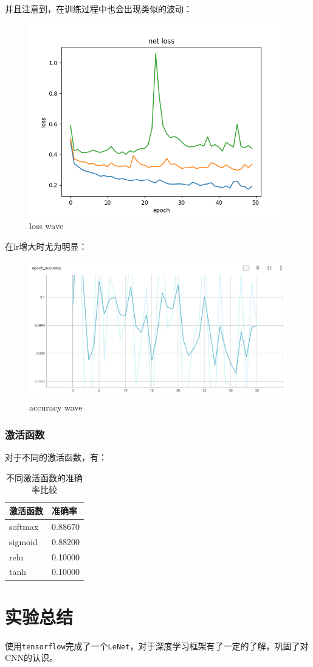 \documentclass[12pt,a4paper]{article}
\begin{document}
并且注意到，在训练过程中也会出现类似的波动：

\begin{figure}[htbp]
    \centering
    \includegraphics[width=0.5\linewidth]{img/loss_wave.png}
    \caption{loss wave}
\end{figure} 

在lr增大时尤为明显：

\begin{figure}[htbp]
    \centering
    \includegraphics[width=0.6\linewidth]{img/accuracy_wave.png}
    \caption{accuracy wave}
\end{figure} 

\subsubsection{激活函数}

对于不同的激活函数，有：

\begin{table}[htbp]
    \centering
    \caption{不同激活函数的准确率比较}
    \begin{tabular}{ll}
        \toprule
        激活函数 & 准确率 \\
        \midrule
        softmax & 0.88670 \\
        sigmoid & 0.88200 \\
        relu & 0.10000 \\
        tanh & 0.10000 \\
        \bottomrule
    \end{tabular}
\end{table}

\section{实验总结}

使用\texttt{tensorflow}完成了一个\texttt{LeNet}，对于深度学习框架有了一定的了解，巩固了对CNN的认识。
\end{document}
